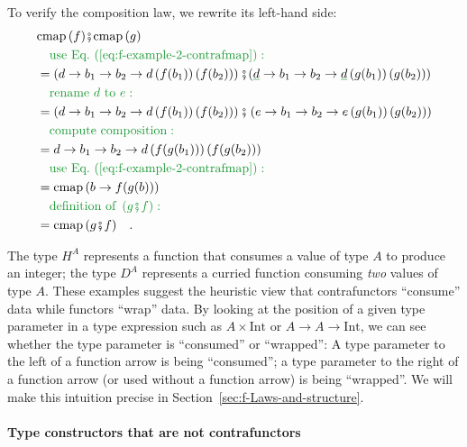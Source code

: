 To verify the composition law, we rewrite its left-hand side:
\begin{align*}
 & \text{cmap}\,(f)\bef\text{cmap}\,(g)\\
 & \quad{\color{greenunder}\text{use Eq.~(\ref{eq:f-example-2-contrafmap})}:}\quad\\
 & =\left(d\rightarrow b_{1}\rightarrow b_{2}\rightarrow d\left(f(b_{1})\right)\left(f(b_{2})\right)\right)\bef(\gunderline d\rightarrow b_{1}\rightarrow b_{2}\rightarrow\gunderline d\left(g(b_{1})\right)\left(g(b_{2})\right))\\
 & \quad{\color{greenunder}\text{rename }d\text{ to }e:}\quad\\
 & =\left(d\rightarrow b_{1}\rightarrow b_{2}\rightarrow d\left(f(b_{1})\right)\left(f(b_{2})\right)\right)\bef\left(e\rightarrow b_{1}\rightarrow b_{2}\rightarrow e\left(g(b_{1})\right)\left(g(b_{2})\right)\right)\\
 & \quad{\color{greenunder}\text{compute composition}:}\quad\\
 & =d\rightarrow b_{1}\rightarrow b_{2}\rightarrow d\left(f(g(b_{1}))\right)\left(f(g(b_{2}))\right)\\
 & \quad{\color{greenunder}\text{use Eq.~(\ref{eq:f-example-2-contrafmap})}:}\quad\\
 & =\text{cmap}\,(b\rightarrow f(g(b)))\\
 & \quad{\color{greenunder}\text{definition of }\left(g\bef f\right):}\quad\\
 & =\text{cmap}\,(g\bef f)\quad.
\end{align*}

The type $H^{A}$ represents a function that consumes a value of type
$A$ to produce an integer; the type $D^{A}$ represents a curried
function consuming \emph{two} values of type $A$. These examples
suggest the heuristic view that contrafunctors \textsf{``}consume\textsf{''} data
while functors \textsf{``}wrap\textsf{''} data. By looking at the position of a given
type parameter in a type expression such as $A\times\text{Int}$ or
$A\rightarrow A\rightarrow\text{Int}$, we can see whether the type
parameter is \textsf{``}consumed\textsf{''} or \textsf{``}wrapped\textsf{''}: A type parameter to
the left of a function arrow is being \textsf{``}consumed\textsf{''}; a type parameter
to the right of a function arrow (or used without a function arrow)
is being \textsf{``}wrapped\textsf{''}. We will make this intuition precise in Section~\ref{sec:f-Laws-and-structure}.

\paragraph{Type constructors that are not contrafunctors }

